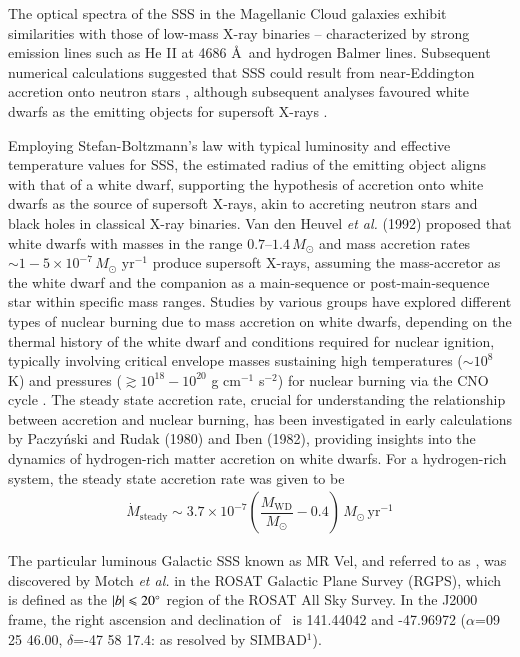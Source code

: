     The optical spectra of the SSS in the Magellanic Cloud galaxies exhibit similarities with those of low-mass X-ray binaries -- characterized by strong emission lines such as He II at 4686 \AA\ and hydrogen Balmer lines. Subsequent numerical calculations suggested that SSS could result from near-Eddington accretion onto neutron stars \cite{kylafis93}, although subsequent analyses favoured white dwarfs as the emitting objects for supersoft X-rays \cite{vandenHeuvel92}.
    
    Employing Stefan-Boltzmann's law with typical luminosity and effective temperature values for SSS, the estimated radius of the emitting object aligns with that of a white dwarf, supporting the hypothesis of accretion onto white dwarfs as the source of supersoft X-rays, akin to accreting neutron stars and black holes in classical X-ray binaries. Van den Heuvel \textit{et al.} (1992) proposed that white dwarfs with masses in the range $0.7–1.4\,M_\odot$ and mass accretion rates $\sim 1-5\times 10^{-7}\,M_\odot\text{ yr}^{-1}$ produce supersoft X-rays, assuming the mass-accretor as the white dwarf and the companion as a main-sequence or post-main-sequence star within specific mass ranges. %
    Studies by various groups have explored different types of nuclear burning due to mass accretion on white dwarfs, depending on the thermal history of the white dwarf and conditions required for nuclear ignition, typically involving critical envelope masses %
    sustaining high temperatures ($\sim 10^8$ K) and pressures ($\gtrsim 10^{18}-10^{20}$ g cm$^{-1}$ s$^{-2}$) for nuclear burning via the CNO cycle \cite{paczynski78,prialnik78,sion79,sienkiewicz80,nomoto82,fujimoto82a,fujimoto82b,iben82,prialnik95,macdonald83}. The steady state accretion rate, crucial for understanding the relationship between accretion and nuclear burning, has been investigated in early calculations by Paczy\'{n}ski and Rudak (1980) \cite{paczynski80} and Iben (1982), providing insights into the dynamics of hydrogen-rich matter accretion on white dwarfs. For a hydrogen-rich system, the steady state accretion rate was given to be \cite{hachisu2001}
	\begin{align}
		\dot{M}_\text{steady}\sim 3.7\times 10^{-7}\left( \dfrac{M_\text{WD}}{M_\odot}-0.4 \right)\,M_\odot\,\text{yr}^{-1} \label{eqn:steady-mass-accr}
	\end{align}
	
	The particular luminous Galactic SSS known as MR Vel, and referred to as \source, was discovered by Motch \textit{et al.} \cite{motch1994} in the ROSAT Galactic Plane Survey (RGPS), which  is defined as the $|b|\leqslant 20\degree$ region of the ROSAT All Sky Survey. In the J2000 frame, the right ascension and declination of \source\ is 141.44042 and -47.96972 ($\alpha$=09 25 46.00, $\delta$=-47 58 17.4: as resolved by SIMBAD$^1$).
	
